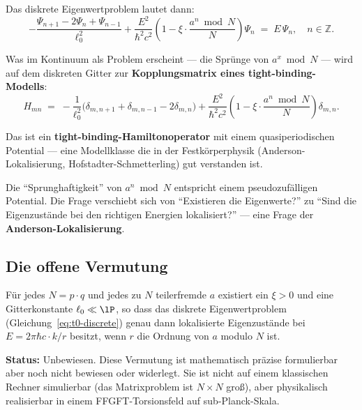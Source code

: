 Das diskrete Eigenwertproblem lautet dann:
\begin{equation}
  \label{eq:t0-discrete}
  -\frac{\Psi_{n+1} - 2\Psi_n + \Psi_{n-1}}{\ell_0^2}
  + \frac{E^2}{\hbar^2 c^2}
  \left(1 - \xi \cdot \frac{a^n \bmod N}{N}\right)\Psi_n
  \;=\; E\,\Psi_n,
  \quad n \in \mathbb{Z}.
\end{equation}

\begin{foundation}
Was im Kontinuum als Problem erscheint ---
die Sprünge von $a^x \bmod N$ ---
wird auf dem diskreten Gitter zur
\textbf{Kopplungsmatrix eines tight-binding-Modells}:
\begin{equation}
  H_{mn} \;=\;
  -\frac{1}{\ell_0^2}
  \bigl(\delta_{m,n+1} + \delta_{m,n-1} - 2\delta_{m,n}\bigr)
  + \frac{E^2}{\hbar^2 c^2}
  \left(1 - \xi \cdot \frac{a^n \bmod N}{N}\right)
  \delta_{m,n}.
\end{equation}

Das ist ein \textbf{tight-binding-Hamiltonoperator}
mit einem quasiperiodischen Potential ---
eine Modellklasse die in der Festkörperphysik
(Anderson-Lokalisierung, Hofstadter-Schmetterling)
gut verstanden ist.

Die ``Sprunghaftigkeit'' von $a^n \bmod N$ entspricht
einem pseudozufälligen Potential.
Die Frage verschiebt sich von
``Existieren die Eigenwerte?''
zu
``Sind die Eigenzustände bei den richtigen Energien
lokalisiert?'' ---
eine Frage der \textbf{Anderson-Lokalisierung}.
\end{foundation}

\subsection{Die offene Vermutung}
\label{sec:ffgft-conjecture}

\begin{keyresult}
Für jedes $N = p \cdot q$ und jedes zu $N$
teilerfremde $a$ existiert ein $\xi > 0$
und eine Gitterkonstante $\ell_0 \ll \lP$,
so dass das diskrete Eigenwertproblem
(Gleichung~\ref{eq:t0-discrete})
genau dann lokalisierte Eigenzustände
bei $E = 2\pi\hbar c \cdot k/r$ besitzt,
wenn $r$ die Ordnung von $a$ modulo $N$ ist.

\medskip
\textbf{Status:} Unbewiesen.
Diese Vermutung ist mathematisch präzise formulierbar
aber noch nicht bewiesen oder widerlegt.
Sie ist nicht auf einem klassischen Rechner simulierbar
(das Matrixproblem ist $N \times N$ groß),
aber physikalisch realisierbar in einem
FFGFT-Torsionsfeld auf sub-Planck-Skala.
\end{keyresult}

